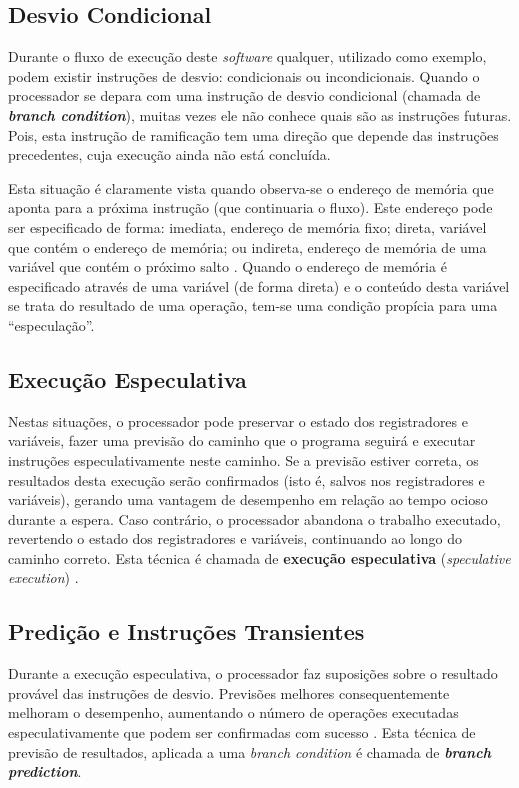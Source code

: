 \documentclass[conference]{IEEEtran}
\begin{document}
\subsection{Desvio Condicional}
Durante o fluxo de execução deste \emph{software} qualquer, utilizado como exemplo, podem existir instruções de desvio: condicionais ou incondicionais. Quando o processador se depara com uma instrução de desvio condicional (chamada de \textbf{\emph{branch condition}}), muitas vezes ele não conhece quais são as instruções futuras. Pois, esta instrução de ramificação tem uma direção que depende das instruções precedentes, cuja execução ainda não está concluída. 

Esta situação é claramente vista quando observa-se o endereço de memória que aponta para a próxima instrução (que continuaria o fluxo). Este endereço pode ser especificado de forma: imediata, endereço de memória fixo; direta, variável que contém o endereço de memória; ou indireta, endereço de memória de uma variável que contém o próximo salto \cite{Debarshi2018Addressing}. Quando o endereço de memória é especificado através de uma variável (de forma direta) e o conteúdo desta variável se trata do resultado de uma operação, tem-se uma condição propícia para uma ``especulação''.

\subsection{Execução Especulativa}
Nestas situações, o processador pode preservar o estado dos registradores e variáveis, fazer uma previsão do caminho que o programa seguirá e executar instruções especulativamente neste caminho. Se a previsão estiver correta, os resultados desta execução serão confirmados (isto é, salvos nos registradores e variáveis), gerando uma vantagem de desempenho em relação ao tempo ocioso durante a espera. Caso contrário, o processador abandona o trabalho executado, revertendo o estado dos registradores e variáveis, continuando ao longo do caminho correto. Esta técnica é chamada de \textbf{execução especulativa} (\emph{speculative execution}) \cite{Kocher2018Spectre}.

\subsection{Predição e Instruções Transientes}
Durante a execução especulativa, o processador faz suposições sobre o resultado provável das instruções de desvio. Previsões melhores consequentemente melhoram o desempenho, aumentando o número de operações executadas especulativamente que podem ser confirmadas com sucesso \cite{Kocher2018Spectre}. Esta técnica de previsão de resultados, aplicada a uma \emph{branch condition} é chamada de \textbf{\emph{branch prediction}}.
\end{document}
